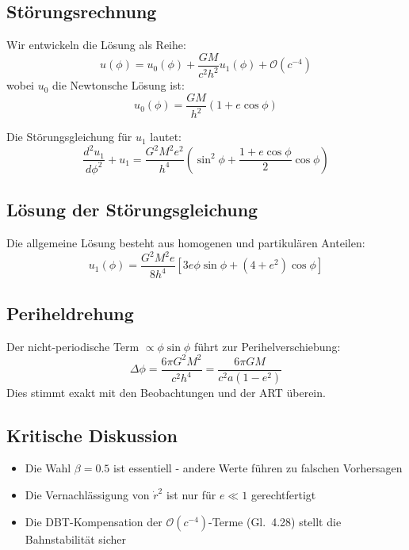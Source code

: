 \subsection{Störungsrechnung}
Wir entwickeln die Lösung als Reihe:
\begin{equation}
u(\phi) = u_0(\phi) + \frac{GM}{c^2h^2}u_1(\phi) + \mathcal{O}(c^{-4})
\end{equation}
wobei $u_0$ die Newtonsche Lösung ist:
\begin{equation}
u_0(\phi) = \frac{GM}{h^2}(1 + e\cos\phi)
\end{equation}

Die Störungsgleichung für $u_1$ lautet:
\begin{equation}
\frac{d^2u_1}{d\phi^2} + u_1 = \frac{G^2M^2e^2}{h^4}\left(\sin^2\phi + \frac{1 + e\cos\phi}{2}\cos\phi\right)
\end{equation}

\subsection{Lösung der Störungsgleichung}
Die allgemeine Lösung besteht aus homogenen und partikulären Anteilen:
\begin{equation}
u_1(\phi) = \frac{G^2M^2e}{8h^4}\left[3e\phi\sin\phi + (4 + e^2)\cos\phi\right]
\end{equation}

\subsection{Periheldrehung}
Der nicht-periodische Term $\propto \phi\sin\phi$ führt zur Perihelverschiebung:
\begin{equation}
\Delta\phi = \frac{6\pi G^2M^2}{c^2h^4} = \frac{6\pi GM}{c^2a(1 - e^2)}
\end{equation}
Dies stimmt exakt mit den Beobachtungen und der ART überein.

\subsection{Kritische Diskussion}
\begin{itemize}
\item Die Wahl $\beta = 0.5$ ist essentiell - andere Werte führen zu falschen Vorhersagen
\item Die Vernachlässigung von $\dot{r}^2$ ist nur für $e \ll 1$ gerechtfertigt
\item Die DBT-Kompensation der $\mathcal{O}(c^{-4})$-Terme (Gl.~4.28) stellt die Bahnstabilität sicher
\end{itemize}

